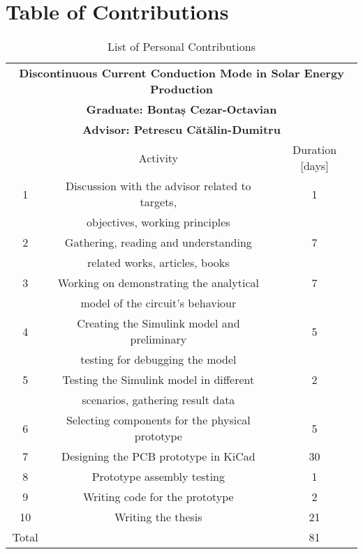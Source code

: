 \chapter{Table of Contributions}
\label{chap:contributions}

\begin{table}[ht!]
\begin{tabular}{|c|c|c|}
\hline
\multicolumn{3}{|c|}{\textbf{Discontinuous Current Conduction Mode in Solar Energy Production}} \\
\multicolumn{3}{|c|}{\textbf{Graduate: Bontaș Cezar-Octavian}} \\
\multicolumn{3}{|c|}{\textbf{Advisor: Petrescu Cătălin-Dumitru}} \\
\hline
 & Activity & Duration [days] \\
\hline
1 & Discussion with the advisor related to targets, & 1\\
& objectives, working principles & \\
\hline
2 & Gathering, reading and understanding & 7\\
& related works, articles, books & \\
\hline
3 & Working on demonstrating the analytical & 7\\
& model of the circuit's behaviour &\\
\hline
4 & Creating the Simulink model and preliminary & 5\\
& testing for debugging the model & \\
\hline
5 & Testing the Simulink model in different & 2\\
& scenarios, gathering result data & \\
\hline
6 & Selecting components for the physical prototype& 5\\
\hline
7 & Designing the PCB prototype in KiCad& 30\\
\hline
8 & Prototype assembly testing & 1\\
\hline
9 & Writing code for the prototype & 2\\
\hline
10 & Writing the thesis& 21\\
\hline
Total & & 81 \\
\hline
\end{tabular}
\centering
\caption{List of Personal Contributions}
\label{tab:contrib_list}
\end{table}